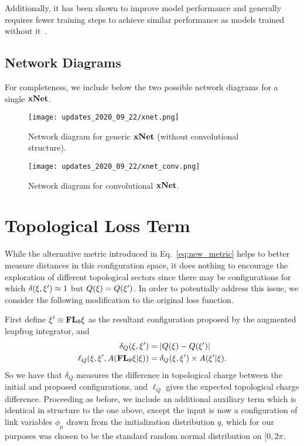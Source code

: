 \begin{appendices}
Additionally, it has been shown to improve model performance and generally
requires fewer training steps to achieve similar performance as models trained
without it~\cite{Ioffe_Szegedy_2015}.

\subsection{Network Diagrams}
For completeness, we include below the two possible network diagrams for a
single \(\mathrm{\mathbf{xNet}}\).

\begin{figure}[htpb]
  \centering
  \texttt{[image: updates\_2020\_09\_22/xnet.png]}
  \caption{Network diagram for generic \(\mathrm{\mathbf{xNet}}\) (without convolutional
  structure).}
\end{figure}
%
\begin{figure}[htpb]
  \centering
  \texttt{[image: updates\_2020\_09\_22/xnet\_conv.png]}
  \caption{Network diagram for convolutional \(\mathrm{\mathbf{xNet}}\).}
\end{figure}

\section{Topological Loss Term}%
\label{sec:topological_loss}
While the alternative metric introduced in Eq.~\ref{eq:new_metric} helps to
better measure distances in this configuration space, it does nothing to
encourage the exploration of different topological sectors since there may be
configurations for which $\delta(\xi, {\xi^{\prime}}) \approx 1$ but $Q(\xi) = Q({\xi^{\prime}})$.
%
In order to potentially address this issue, we consider the following
modification to the original loss function.

First define ${\xi^{\prime}}\equiv {\mathbf{FL}_{\theta}} \xi$ as the resultant configuration proposed by
the augmented leapfrog integrator, and
%
\begin{align}
\delta_{Q}{(\xi, \xi^{\prime})} &= \left|Q{(\xi)} - Q{(\xi^{\prime})}\right| \\
\ell_{Q}{\left(\xi, {\xi^{\prime}}, A{({\mathbf{FL}_{\theta}}\xi|\xi)}\right)} &= \delta_{Q}{(\xi,{\xi^{\prime}})}
  \times A{({\xi^{\prime}}|\xi)}.
\end{align}
%
So we have that $\delta_{Q}$ measures the difference in topological charge
between the initial and proposed configurations, and $\ell_{Q}$ gives the
expected topological charge difference.
%
Proceeding as before, we include an additional auxiliary term which is
identical in structure to the one above, except the input is now a
configuration of link variables $\phi_{\mu}$ drawn from the initialization
distribution $q$, which for our purposes was chosen to be the standard random
normal distribution on $[0, 2\pi$. %


\end{appendices}

